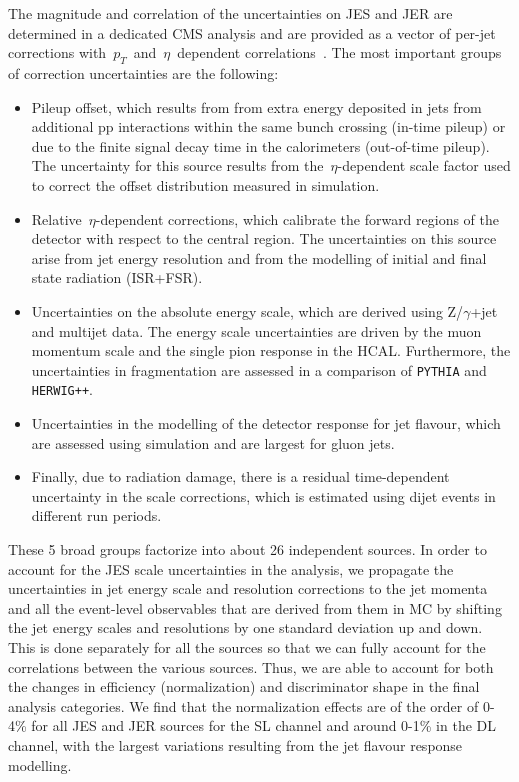 The magnitude and correlation of the uncertainties on JES and JER are determined in a dedicated CMS analysis and are provided as a vector of per-jet corrections with~$p_T$~and~$\eta$~dependent correlations~\cite{cms_jec_2017}. The most important groups of correction uncertainties are the following:

\begin{itemize}
\item Pileup offset, which results from from extra energy deposited in jets from additional pp interactions within the same bunch crossing (in-time pileup) or due to the finite signal decay time in the calorimeters (out-of-time pileup). The uncertainty for this source results from the~$\eta$-dependent scale factor used to correct the offset distribution measured in simulation.
\item Relative~$\eta$-dependent corrections, which calibrate the forward regions of the detector with respect to the central region. The uncertainties on this source arise from jet energy resolution and from the modelling of initial and final state radiation (ISR+FSR).
\item Uncertainties on the absolute energy scale, which are derived using Z/$\gamma$+jet and multijet data. The energy scale uncertainties are driven by the muon momentum scale and the single pion response in the HCAL. Furthermore, the uncertainties in fragmentation are assessed in a comparison of \texttt{PYTHIA} and \texttt{HERWIG++}.
\item Uncertainties in the modelling of the detector response for jet flavour, which are assessed using simulation and are largest for gluon jets.
\item Finally, due to radiation damage, there is a residual time-dependent uncertainty in the scale corrections, which is estimated using dijet events in different run periods.
\end{itemize}

These 5 broad groups factorize into about 26 independent sources. In order to account for the JES scale uncertainties in the analysis, we propagate the uncertainties in jet energy scale and resolution corrections to the jet momenta and all the event-level observables that are derived from them in MC by shifting the jet energy scales and resolutions by one standard deviation up and down. This is done separately for all the sources so that we can fully account for the correlations between the various sources. Thus, we are able to account for both the changes in efficiency (normalization) and discriminator shape in the final analysis categories. We find that the normalization effects are of the order of 0-4\% for all JES and JER sources for the SL channel and around 0-1\% in the DL channel, with the largest variations resulting from the jet flavour response modelling.

